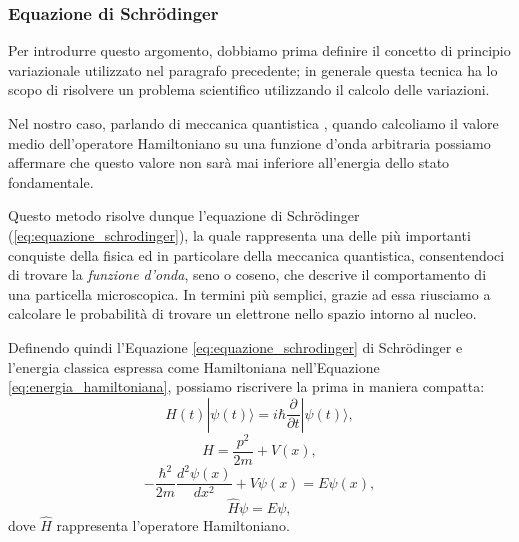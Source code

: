 \subsubsection{Equazione di Schrödinger}
Per introdurre questo argomento, dobbiamo prima definire il concetto di principio variazionale utilizzato nel paragrafo precedente; in generale questa tecnica ha lo scopo di risolvere un problema scientifico utilizzando il calcolo delle variazioni.

Nel nostro caso, parlando di meccanica quantistica \cite{sakai2018equazione}, quando calcoliamo il valore medio dell'operatore Hamiltoniano su una funzione d'onda arbitraria possiamo affermare che questo valore non sarà mai inferiore all'energia dello stato fondamentale.

Questo metodo risolve dunque l'equazione di Schrödinger (\ref{eq:equazione_schrodinger}), la quale rappresenta una delle più importanti conquiste della fisica ed in particolare della meccanica quantistica, consentendoci di trovare la \textit{funzione d'onda}, seno o coseno, che descrive il comportamento di una particella microscopica.
In termini più semplici, grazie ad essa riusciamo a calcolare le probabilità di trovare un elettrone nello spazio intorno al nucleo.

Definendo quindi l'Equazione \ref{eq:equazione_schrodinger} di Schrödinger e l'energia classica espressa come Hamiltoniana nell'Equazione \ref{eq:energia_hamiltoniana}, possiamo riscrivere la prima in maniera compatta:
\begin{equation}
    \label{eq:equazione_schrodinger}
    H(t)|\psi(t)\rangle=i\hbar\dfrac{\partial}{\partial t}|\psi(t)\rangle,
\end{equation}
\begin{equation}
    \label{eq:energia_hamiltoniana}
    H=\dfrac{p^{2}}{2m}+V(x),
\end{equation}
\begin{equation}
    \label{eq:sistema_qualsiasi_schrodinger}
    -\dfrac{\hbar^{2}}{2m}\dfrac{d^{2}\psi (x)}{dx^{2}}+V\psi (x)=E\psi (x),
\end{equation}
\begin{equation}
    \hat{H}\psi = E\psi,
\end{equation}
dove $\hat{H}$ rappresenta l'operatore Hamiltoniano.